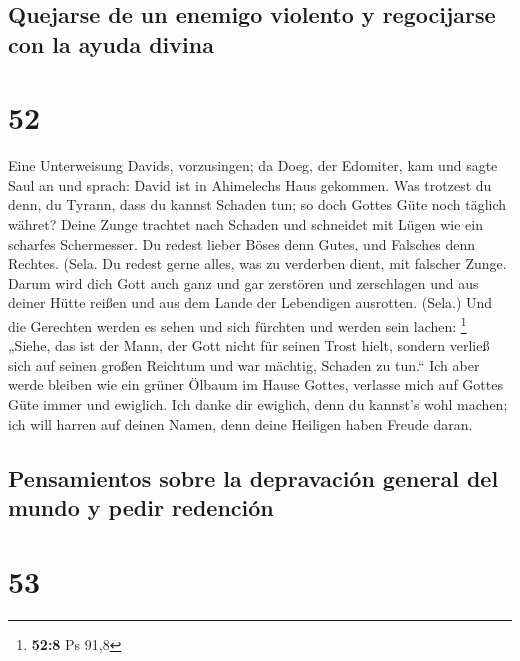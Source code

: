 \hypertarget{quejarse-de-un-enemigo-violento-y-regocijarse-con-la-ayuda-divina}{%
\subsection{Quejarse de un enemigo violento y regocijarse con la ayuda
divina}\label{quejarse-de-un-enemigo-violento-y-regocijarse-con-la-ayuda-divina}}

\hypertarget{section-51}{%
\section{52}\label{section-51}}

 Eine Unterweisung Davids, vorzusingen;  da
Doeg, der Edomiter, kam und sagte Saul an und sprach: David ist in
Ahimelechs Haus gekommen.  Was trotzest du denn, du
Tyrann, dass du kannst Schaden tun; so doch Gottes Güte noch täglich
währet?  Deine Zunge trachtet nach Schaden und schneidet
mit Lügen wie ein scharfes Schermesser.  Du redest lieber
Böses denn Gutes, und Falsches denn Rechtes. (Sela.  Du
redest gerne alles, was zu verderben dient, mit falscher Zunge.
 Darum wird dich Gott auch ganz und gar zerstören und
zerschlagen und aus deiner Hütte reißen und aus dem Lande der Lebendigen
ausrotten. (Sela.)  Und die Gerechten werden es sehen und
sich fürchten und werden sein lachen: \footnote{\textbf{52:8} Ps 91,8}
 „Siehe, das ist der Mann, der Gott nicht für seinen Trost
hielt, sondern verließ sich auf seinen großen Reichtum und war mächtig,
Schaden zu tun.``  Ich aber werde bleiben wie ein grüner
Ölbaum im Hause Gottes, verlasse mich auf Gottes Güte immer und
ewiglich.  Ich danke dir ewiglich, denn du kannst's wohl
machen; ich will harren auf deinen Namen, denn deine Heiligen haben
Freude daran.

\hypertarget{pensamientos-sobre-la-depravaciuxf3n-general-del-mundo-y-pedir-redenciuxf3n-1}{%
\subsection{Pensamientos sobre la depravación general del mundo y pedir
redención}\label{pensamientos-sobre-la-depravaciuxf3n-general-del-mundo-y-pedir-redenciuxf3n-1}}

\hypertarget{section-52}{%
\section{53}\label{section-52}}

